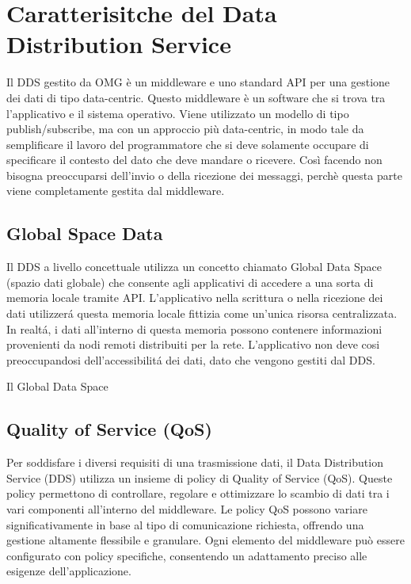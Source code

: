 \section{Caratterisitche del Data Distribution Service}

Il DDS gestito da OMG è un middleware e uno standard API per una gestione
dei dati di tipo data-centric. Questo middleware è un software che si trova
tra l'applicativo e il sistema operativo. Viene utilizzato un modello
di tipo publish/subscribe, ma con un approccio più data-centric, in modo
tale da semplificare il lavoro del programmatore che si deve solamente
occupare di specificare il contesto del dato che deve mandare o ricevere.
Così facendo non bisogna preoccuparsi dell'invio o della ricezione
dei messaggi, perchè questa parte viene completamente gestita dal middleware.
\cite{whatisdds}

\subsection{Global Space Data}
Il DDS a livello concettuale utilizza un concetto chiamato Global Data 
Space (spazio dati globale) che consente agli applicativi
di accedere a una sorta di memoria locale tramite API.
L'applicativo nella scrittura o nella ricezione dei dati utilizzerá 
questa memoria locale fittizia come un'unica risorsa centralizzata.
In realtá, i dati all'interno di questa memoria possono contenere
informazioni provenienti da nodi remoti distribuiti per la rete. 
L'applicativo non deve cosi preoccupandosi dell'accessibilitá dei dati,
dato che vengono gestiti dal DDS.

Il Global Data Space
\cite{whatisdds}

\subsection{Quality of Service (QoS)}

Per soddisfare i diversi requisiti di una trasmissione dati, 
il Data Distribution Service (DDS) utilizza un insieme di policy di 
Quality of Service (QoS). Queste policy permettono di controllare, 
regolare e ottimizzare lo scambio di dati tra i vari componenti 
all'interno del middleware. Le policy QoS possono variare 
significativamente in base al tipo di comunicazione richiesta, 
offrendo una gestione altamente flessibile e granulare. 
Ogni elemento del middleware può essere configurato 
con policy specifiche, consentendo un adattamento preciso alle 
esigenze dell'applicazione.

